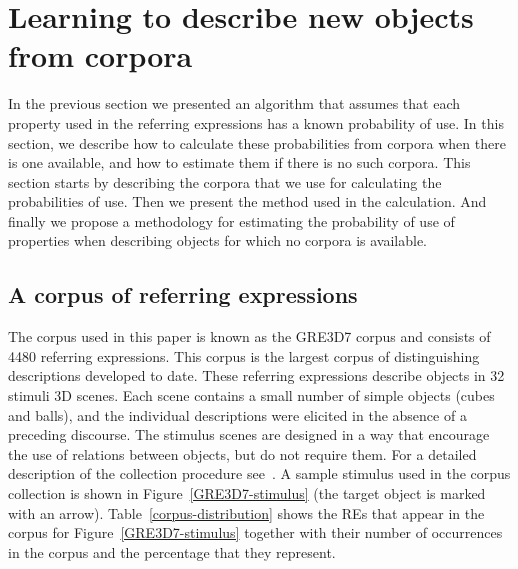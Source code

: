 \section{Learning to describe new objects from corpora}
\label{sec:learning}

In the previous section we presented an algorithm that assumes that each property used in the referring expressions has a known probability of use. In this section, we describe how to calculate these probabilities from corpora when there is one available, and how to estimate them if there is no such corpora. This section starts by describing the corpora that we use for calculating the probabilities of use. Then we present the method used in the calculation. And finally we propose a methodology for estimating the probability of use of properties when describing objects for which no corpora is available. 

\subsection{A corpus of referring expressions}

The corpus used in this paper is known as the GRE3D7 corpus and consists of 4480 referring expressions. This corpus is the largest corpus of distinguishing descriptions developed to date. These referring expressions describe objects in 32 stimuli 3D scenes. Each scene contains a small number of simple objects (cubes and balls), and the individual descriptions were elicited in the absence of a preceding discourse. The stimulus scenes are designed in a way that encourage the use of relations between objects, but do not require them. For a detailed description of the collection procedure see~\cite[Chapter 5]{viet:gene11}. A sample stimulus used in the corpus collection is shown in Figure~\ref{GRE3D7-stimulus} (the target object is marked with an arrow). Table~\ref{corpus-distribution} shows the REs that appear in the corpus for Figure~\ref{GRE3D7-stimulus} together with their number of occurrences in the corpus and the percentage that they represent.  

